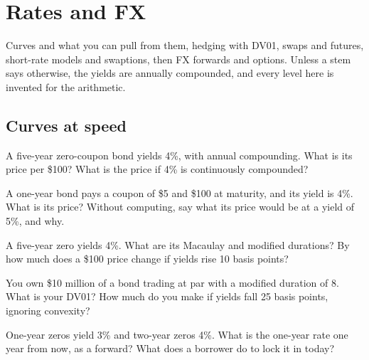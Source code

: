 \chapter{Rates and FX}\label{ch:iv2:rates-and-fx}

\begin{ivtrains}
Curves and what you can pull from them, hedging with DV01, swaps and futures, short-rate models and swaptions, then FX forwards and options. Unless a stem says otherwise, the yields are annually compounded, and every level here is invented for the arithmetic.
\end{ivtrains}

\section{Curves at speed}

\begin{question}\label{iq:iv2:rates-and-fx:1}
A five-year zero-coupon bond yields 4\%, with annual compounding. What is its price per \$100? What is the price if 4\% is continuously compounded?
\end{question}

\begin{question}\label{iq:iv2:rates-and-fx:2}
A one-year bond pays a coupon of \$5 and \$100 at maturity, and its yield is 4\%. What is its price? Without computing, say what its price would be at a yield of 5\%, and why.
\end{question}

\begin{question}\label{iq:iv2:rates-and-fx:3}
A five-year zero yields 4\%. What are its Macaulay and modified durations? By how much does a \$100 price change if yields rise 10 basis points?
\end{question}

\begin{question}\label{iq:iv2:rates-and-fx:4}
You own \$10 million of a bond trading at par with a modified duration of 8. What is your DV01? How much do you make if yields fall 25 basis points, ignoring convexity?
\end{question}

\begin{question}\label{iq:iv2:rates-and-fx:5}
One-year zeros yield 3\% and two-year zeros 4\%. What is the one-year rate one year from now, as a forward? What does a borrower do to lock it in today?
\end{question}

